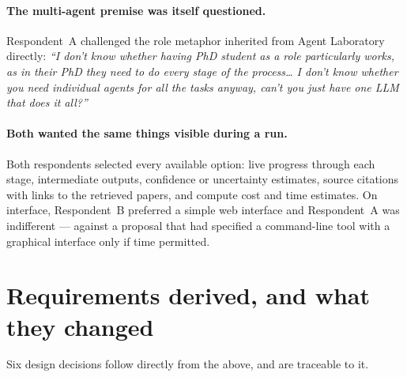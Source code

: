 \paragraph{The multi-agent premise was itself questioned.} Respondent~A challenged the role
metaphor inherited from Agent Laboratory~\cite{schmidgall2025agentlab} directly: \emph{``I
don't know whether having PhD student as a role particularly works, as in their PhD they need
to do every stage of the process\ldots{} I don't know whether you need individual agents for
all the tasks anyway, can't you just have one LLM that does it all?''}

\paragraph{Both wanted the same things visible during a run.} Both respondents selected every
available option: live progress through each stage, intermediate outputs, confidence or
uncertainty estimates, source citations with links to the retrieved papers, and compute cost
and time estimates. On interface, Respondent~B preferred a simple web interface and
Respondent~A was indifferent --- against a proposal that had specified a command-line tool
with a graphical interface only if time permitted.

\section{Requirements derived, and what they changed}
\label{sec:ra-decisions}

Six design decisions follow directly from the above, and are traceable to it.

